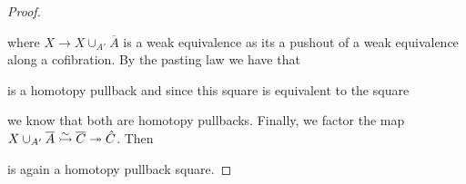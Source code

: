 \begin{lemma}
\begin{proof}
\begin{center}
\begin{tikzcd} [sep = 4em]
            \end{tikzcd}
        \end{center}
        where $X\to X\cup_{A'}\overline{A}$ is a weak equivalence as its a pushout of a weak equivalence along a cofibration.
        By the pasting law we have that
        \begin{center}
        \end{center}
        is a homotopy pullback and since this square is equivalent to the square
        \begin{center}
        \end{center}
        we know that both are homotopy pullbacks.
        Finally, we factor the map $X\cup_{A'}\overline{A}\xtailrightarrow[]{\sim}\overline{C}\xtwoheadrightarrow{}\hat{C}$.
        Then 
        \begin{center}
        \end{center}
        is again a homotopy pullback square.


\end{proof}
\end{lemma}
